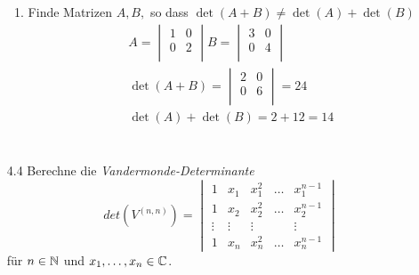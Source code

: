 \documentclass{HM}
\begin{document}
\begin{enumerate}
\begin{enumerate}
			\item Finde Matrizen $A,B,$ so dass $\det(A+B)\not=\det(A)+\det(B)$\\
			\begin{align*}
				A=\begin{vmatrix}
					1&0\\
					0&2\\
				\end{vmatrix}
				B=\begin{vmatrix}
					3&0\\
					0&4\\
				\end{vmatrix}\\
			\det(A+B)  = \begin{vmatrix}
				2&0\\
				0&6\\
			\end{vmatrix}= 24\\
			\det(A) + \det(B) = 2 + 12 = 14\\
			\end{align*}\\
		
		\end{enumerate}
		
	\item[4.4] Berechne die \textit{Vandermonde-Determinante}\\
		$$det(V^{(n,n)})=\begin{vmatrix}
			1&x_1&x_1^2&\hdots&x_1^{n-1}\\
			1&x_2&x_2^2&\hdots&x_2^{n-1}\\
			\vdots&\vdots&\vdots&&\vdots\\
			1&x_n&x_n^2&\hdots&x_n^{n-1}
		\end{vmatrix}$$
		für $n\in\mathbb{N}$ und $x_1,\hdots,x_n\in\mathbb{C}$.
		

\end{enumerate}
\end{document}
